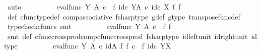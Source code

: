 \begin{isabellebody}
\ auto\isanewline
\ \ \ \ \isamarkupfalse%
\ \isamarkupfalse%
\ {\isachardoublequoteopen}{\isachardot}{\kern0pt}{\isachardot}{\kern0pt}{\isachardot}{\kern0pt}\ {\isacharequal}{\kern0pt}\ eval{\isacharunderscore}{\kern0pt}func\ Y\ A\ {\isasymcirc}\isactrlsub c\ {\isacharparenleft}{\kern0pt}{\isasymphi}\ {\isasymtimes}\isactrlsub f\ id\isactrlsub c\ {\isacharparenleft}{\kern0pt}Y\isactrlbsup A\isactrlesup {\isacharparenright}{\kern0pt}{\isacharparenright}{\kern0pt}\ {\isasymcirc}\isactrlsub c\ {\isacharparenleft}{\kern0pt}id\isactrlsub c\ X\ {\isasymtimes}\isactrlsub f\ f\isactrlsup {\isasymsharp}{\isacharparenright}{\kern0pt}{\isachardoublequoteclose}\isanewline
\ \ \ \ \ \ \isamarkupfalse%
\ {\isasymphi}{\isacharunderscore}{\kern0pt}def\ cfunc{\isacharunderscore}{\kern0pt}type{\isacharunderscore}{\kern0pt}def\ comp{\isacharunderscore}{\kern0pt}associative\ fsharp{\isacharunderscore}{\kern0pt}type\ g{\isacharunderscore}{\kern0pt}def\ g{\isacharunderscore}{\kern0pt}type\ transpose{\isacharunderscore}{\kern0pt}func{\isacharunderscore}{\kern0pt}def\ \isamarkupfalse%
\ {\isacharparenleft}{\kern0pt}typecheck{\isacharunderscore}{\kern0pt}cfuncs{\isacharcomma}{\kern0pt}\ smt{\isacharparenright}{\kern0pt}\isanewline
\ \ \ \ \isamarkupfalse%
\ \isamarkupfalse%
\ {\isachardoublequoteopen}{\isachardot}{\kern0pt}{\isachardot}{\kern0pt}{\isachardot}{\kern0pt}\ {\isacharequal}{\kern0pt}\ eval{\isacharunderscore}{\kern0pt}func\ Y\ A\ {\isasymcirc}\isactrlsub c\ {\isacharparenleft}{\kern0pt}{\isasymphi}\ {\isasymtimes}\isactrlsub f\ f\isactrlsup {\isasymsharp}{\isacharparenright}{\kern0pt}{\isachardoublequoteclose}\isanewline
\ \ \ \ \ \ \isamarkupfalse%
\ {\isacharparenleft}{\kern0pt}smt\ {\isasymphi}{\isacharunderscore}{\kern0pt}def\ cfunc{\isacharunderscore}{\kern0pt}cross{\isacharunderscore}{\kern0pt}prod{\isacharunderscore}{\kern0pt}comp{\isacharunderscore}{\kern0pt}cfunc{\isacharunderscore}{\kern0pt}cross{\isacharunderscore}{\kern0pt}prod\ fsharp{\isacharunderscore}{\kern0pt}type\ id{\isacharunderscore}{\kern0pt}left{\isacharunderscore}{\kern0pt}unit{}\ id{\isacharunderscore}{\kern0pt}right{\isacharunderscore}{\kern0pt}unit{}\ id{\isacharunderscore}{\kern0pt}type{\isacharparenright}{\kern0pt}\isanewline
\ \ \ \ \isamarkupfalse%
\ \isamarkupfalse%
\ {\isachardoublequoteopen}{\isachardot}{\kern0pt}{\isachardot}{\kern0pt}{\isachardot}{\kern0pt}\ {\isacharequal}{\kern0pt}\ eval{\isacharunderscore}{\kern0pt}func\ Y\ A\ {\isasymcirc}\isactrlsub c\ {\isacharparenleft}{\kern0pt}id{\isacharparenleft}{\kern0pt}A{\isacharparenright}{\kern0pt}\ {\isasymtimes}\isactrlsub f\ f\isactrlsup {\isasymsharp}{\isacharparenright}{\kern0pt}\ {\isasymcirc}\isactrlsub c\ {\isacharparenleft}{\kern0pt}{\isasymphi}\ {\isasymtimes}\isactrlsub f\ id\isactrlsub c\ {\isacharparenleft}{\kern0pt}Y\isactrlbsup X\isactrlesup {\isacharparenright}{\kern0pt}{\isacharparenright}{\kern0pt}{\isachardoublequoteclose}\isanewline

\end{isabellebody}
